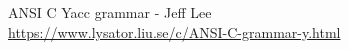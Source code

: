 \label{marker}

\begin{thebibliography}{9}

ANSI C Yacc grammar - Jeff Lee\\
 \url{https://www.lysator.liu.se/c/ANSI-C-grammar-y.html}

\end{thebibliography}